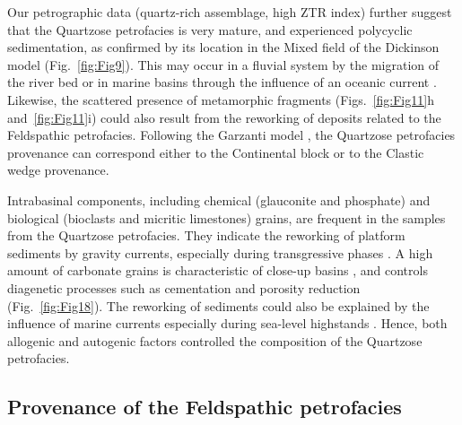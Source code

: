 \documentclass[twoside]{article}
\begin{document}
Our petrographic data (quartz-rich assemblage, high ZTR index) further suggest that the Quartzose petrofacies is very mature, and experienced polycyclic sedimentation, as confirmed by its location in the Mixed field of the Dickinson model (Fig.~\ref{fig:Fig9}). This may occur in a fluvial system by the migration of the river bed \citep{Amorosi2011} or in marine basins through the influence of an oceanic current \citep{Morton1999}. Likewise, the scattered presence of metamorphic fragments (Figs.~\ref{fig:Fig11}h and~\ref{fig:Fig11}i) could also result from the reworking of deposits related to the Feldspathic petrofacies. Following the Garzanti model \citep{Garzanti2007b}, the Quartzose petrofacies provenance can correspond either to the Continental block or to the Clastic wedge provenance.\par
Intrabasinal components, including chemical (glauconite and phosphate) and biological (bioclasts and micritic limestones) grains, are frequent in the samples from the Quartzose petrofacies. They indicate the reworking of platform sediments by gravity currents, especially during transgressive phases \citep{Odin1981,Garzanti1991}. A high amount of carbonate grains is characteristic of close-up basins \citep{Critelli2007}, and controls diagenetic processes such as cementation and porosity reduction (Fig.~\ref{fig:Fig18}). The reworking of sediments could also be explained by the influence of marine currents \citep{Ingersoll1990,Ingersoll1993} especially during sea-level highstands \citep{Amorosi2011}. Hence, both allogenic and autogenic factors controlled the composition of the Quartzose petrofacies.


\subsection{Provenance of the Feldspathic petrofacies}
\end{document}
